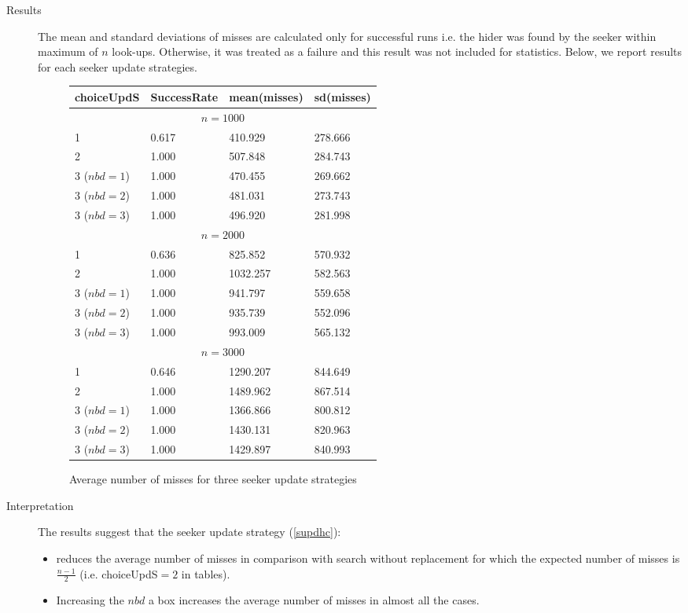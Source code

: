 \documentclass[11pt,a4paper,draft]{article}
\begin{document}
\begin{description}
	\item[Results] The mean and standard deviations of misses are calculated only for successful runs i.e. the hider was found by the seeker within maximum of $n$ look-ups. Otherwise, it was treated as a failure and this result was not included for statistics. Below, we report results for each seeker update strategies.
	\begin{figure}[!h]
		\centering
		\begin{tabular}{llll}
			\hline \hline 
			choiceUpdS & SuccessRate & mean(misses) & sd(misses) \\
			\hline \hline 
			\multicolumn{4}{c}{$n = 1000$} \\ 
			\hline 
			1 &  0.617 & 410.929 & 278.666 \\
			2 &  1.000 & 507.848 & 284.743 \\
			3 ($nbd=1$) & 1.000 & 470.455 & 269.662 \\
			3 ($nbd=2$) & 1.000 & 481.031 & 273.743 \\
			3 ($nbd=3$) & 1.000 & 496.920 & 281.998 \\
			\hline 
			\hline 
			\multicolumn{4}{c}{$n = 2000$} \\ 
			\hline 
			1 &  0.636 & 825.852 & 570.932 \\
			2 &  1.000 & 1032.257 & 582.563 \\
			3 ($nbd=1$) & 1.000 & 941.797 & 559.658 \\
			3 ($nbd=2$) & 1.000 & 935.739 & 552.096 \\
			3 ($nbd=3$) & 1.000 & 993.009 & 565.132 \\
			\hline 
			\hline 
			\multicolumn{4}{c}{$n = 3000$} \\ 
			\hline 
			1 &  0.646 & 1290.207 & 844.649 \\
			2 &  1.000 & 1489.962 & 867.514 \\
			3 ($nbd=1$) & 1.000 & 1366.866 & 800.812 \\
			3 ($nbd=2$) & 1.000 & 1430.131 & 820.963 \\
			3 ($nbd=3$) & 1.000 & 1429.897 & 840.993 \\
			\hline 
			\hline 
		\end{tabular}
		\caption{Average number of misses for three seeker update strategies}
	\end{figure}

	\item[Interpretation] The results suggest that the seeker update strategy (\ref{supdhc}):
	\begin{itemize}
		\item reduces the average number of misses in comparison with search without replacement for which the expected number of misses is $\frac{n-1}{2}$ (i.e. choiceUpdS$=2$ in tables).
		\item Increasing the $nbd$ a box increases the average number of misses in almost all the cases.
	\end{itemize}
	
\end{description}


	
\end{document}
